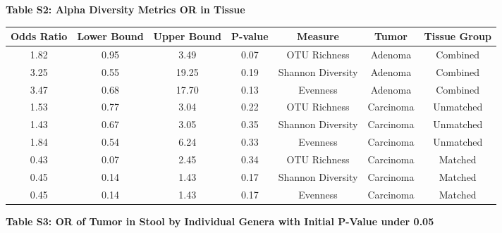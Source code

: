 \documentclass[12pt,]{article}
\begin{document}
\newpage

\textbf{Table S2: Alpha Diversity Metrics OR in Tissue}

\footnotesize

\begin{longtable}[]{@{}ccccccc@{}}
\toprule
Odds Ratio & Lower Bound & Upper Bound & P-value & Measure & Tumor &
Tissue Group\tabularnewline
\midrule
\endhead
1.82 & 0.95 & 3.49 & 0.07 & OTU Richness & Adenoma &
Combined\tabularnewline
3.25 & 0.55 & 19.25 & 0.19 & Shannon Diversity & Adenoma &
Combined\tabularnewline
3.47 & 0.68 & 17.70 & 0.13 & Evenness & Adenoma &
Combined\tabularnewline
1.53 & 0.77 & 3.04 & 0.22 & OTU Richness & Carcinoma &
Unmatched\tabularnewline
1.43 & 0.67 & 3.05 & 0.35 & Shannon Diversity & Carcinoma &
Unmatched\tabularnewline
1.84 & 0.54 & 6.24 & 0.33 & Evenness & Carcinoma &
Unmatched\tabularnewline
0.43 & 0.07 & 2.45 & 0.34 & OTU Richness & Carcinoma &
Matched\tabularnewline
0.45 & 0.14 & 1.43 & 0.17 & Shannon Diversity & Carcinoma &
Matched\tabularnewline
0.45 & 0.14 & 1.43 & 0.17 & Evenness & Carcinoma &
Matched\tabularnewline
\bottomrule
\end{longtable}

\normalsize

\newpage

\textbf{Table S3: OR of Tumor in Stool by Individual Genera with Initial
P-Value under 0.05}

\footnotesize
\end{document}
